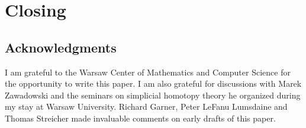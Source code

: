 \documentclass{tac}
\begin{document}


\section{Closing}

\subsection*{Acknowledgments} 
I am grateful to the Warsaw Center of Mathematics and Computer Science for the opportunity to write this paper. I am also grateful for discussions with Marek Zawadowski and the seminars on simplicial homotopy theory he organized during my stay at Warsaw University. Richard Garner, Peter LeFanu Lumsdaine and Thomas Streicher made invaluable comments on early drafts of this paper.



\printbibliography
\end{document}
